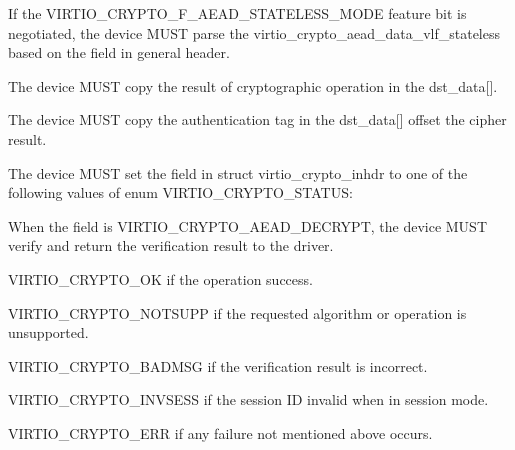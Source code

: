 
\begin{itemize*}
\item If the VIRTIO_CRYPTO_F_AEAD_STATELESS_MODE feature bit is negotiated, the
    device MUST parse the virtio_crypto_aead_data_vlf_stateless based on the 
	field in general header.
\item The device MUST copy the result of cryptographic operation in the dst_data[].
\item The device MUST copy the authentication tag in the dst_data[] offset the cipher result.
\item The device MUST set the  field in struct virtio_crypto_inhdr to
    one of the following values of enum VIRTIO_CRYPTO_STATUS:
\item When the  field is VIRTIO_CRYPTO_AEAD_DECRYPT, the device MUST
    verify and return the verification result to the driver.
\begin{itemize*}
\item VIRTIO_CRYPTO_OK if the operation success.
\item VIRTIO_CRYPTO_NOTSUPP if the requested algorithm or operation is unsupported.
\item VIRTIO_CRYPTO_BADMSG if the verification result is incorrect.
\item VIRTIO_CRYPTO_INVSESS if the session ID invalid when in session mode.
\item VIRTIO_CRYPTO_ERR if any failure not mentioned above occurs.
\end{itemize*}
\end{itemize*}
